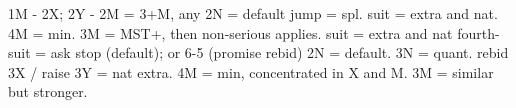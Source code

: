 1M - 2X; 2Y -
2M = 3+M, any
    2N = default
        jump = spl. suit = extra and nat. 4M = min.
        3M = MST+, then non-serious applies.
    suit = extra and nat
fourth-suit = ask stop (default); or 6-5 (promise rebid)
2N = default. 3N = quant.
rebid 3X / raise 3Y = nat extra.
4M = min, concentrated in X and M. 3M = similar but stronger. 